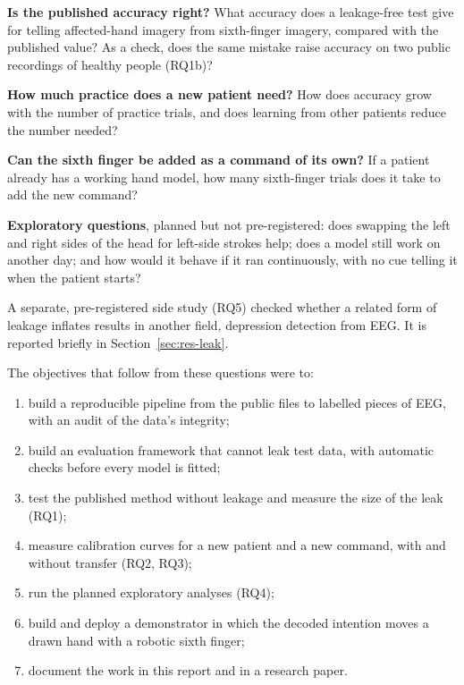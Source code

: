\begin{description}[leftmargin=1.1cm,style=nextline]
  \item[RQ1] \textbf{Is the published accuracy right?} What accuracy does a leakage-free test give
  for telling affected-hand imagery from sixth-finger imagery, compared with the published
  value? As a check, does the same mistake raise accuracy on two public recordings of
  healthy people (RQ1b)?
  \item[RQ2] \textbf{How much practice does a new patient need?} How does accuracy grow
  with the number of practice trials, and does learning from other patients reduce the
  number needed?
  \item[RQ3] \textbf{Can the sixth finger be added as a command of its own?} If a patient
  already has a working hand model, how many sixth-finger trials does it take to add the
  new command?
  \item[RQ4] \textbf{Exploratory questions}, planned but not pre-registered: does swapping
  the left and right sides of the head for left-side strokes help; does a model still work
  on another day; and how would it behave if it ran continuously, with no cue telling it
  when the patient starts?
\end{description}

A separate, pre-registered side study (RQ5) checked whether a related form of leakage
inflates results in another field, depression detection from EEG. It is reported briefly
in Section~\ref{sec:res-leak}.

The objectives that follow from these questions were to:
\begin{enumerate}
  \item build a reproducible pipeline from the public files to labelled pieces of EEG,
  with an audit of the data's integrity;
  \item build an evaluation framework that cannot leak test data, with automatic checks
  before every model is fitted;
  \item test the published method without leakage and measure the size of the leak (RQ1);
  \item measure calibration curves for a new patient and a new command, with and without
  transfer (RQ2, RQ3);
  \item run the planned exploratory analyses (RQ4);
  \item build and deploy a demonstrator in which the decoded intention moves a drawn hand with
  a robotic sixth finger;
  \item document the work in this report and in a research paper.
\end{enumerate}

